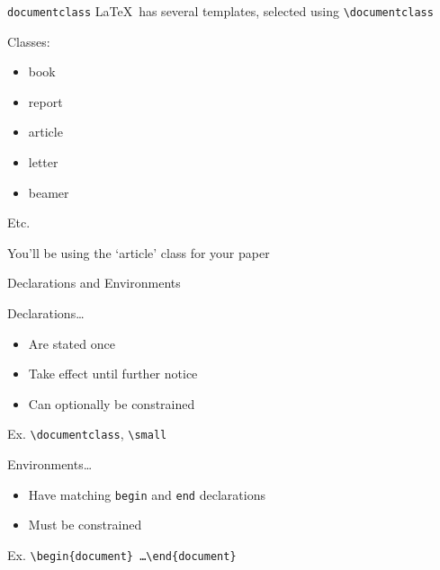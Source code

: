 \begin{frame}{\texttt{documentclass}}
\LaTeX~has several templates, selected using \texttt{\textbackslash documentclass}
\begin{block}{Classes:}
\begin{itemize}
\item book
\item report
\item article
\item letter
\item beamer
\end{itemize}
Etc.
\end{block}
You'll be using the `article' class for your paper
\end{frame}

\begin{frame}{Declarations and Environments}
\begin{block}{Declarations\ldots}
\begin{itemize}
\item Are stated once
\item Take effect until further notice
\item Can optionally be constrained
\end{itemize}
Ex. \texttt{\textbackslash documentclass}, \texttt{\textbackslash small}
\end{block}
\begin{block}{Environments\ldots}
\begin{itemize}
\item Have matching \texttt{begin} and \texttt{end} declarations
\item Must be constrained
\end{itemize}
Ex. \texttt{\textbackslash begin\{document\} \ldots \textbackslash end\{document\}}
\end{block}
\end{frame}

